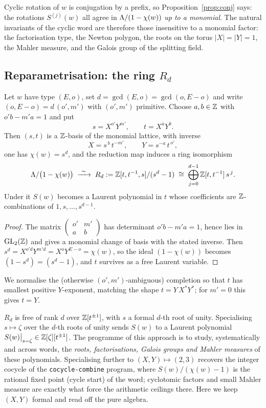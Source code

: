 Cyclic rotation of $w$ is conjugation by a prefix, so Proposition~\ref{prop:conj} says: the
rotations $S^{(j)}(w)$ all agree in $\Lambda/(1-\chi(w))$ \emph{up to a monomial}. The natural
invariants of the cyclic word are therefore those insensitive to a monomial factor: the
factorisation type, the Newton polygon, the roots on the torus $|X|=|Y|=1$, the Mahler
measure, and the Galois group of the splitting field.

\subsection*{Reparametrisation: the ring $R_d$}

\begin{prop}\label{prop:reparam}
Let $w$ have type $(E,o)$, set $d=\gcd(E,o)=\gcd(o,E-o)$ and write $(o,E-o)=d\,(o',m')$ with
$(o',m')$ primitive. Choose $a,b\in\mathbb{Z}$ with $o'b-m'a=1$ and put
\[
   s=X^{o'}Y^{m'},\qquad t=X^{a}Y^{b}.
\]
Then $(s,t)$ is a $\mathbb{Z}$-basis of the monomial lattice, with inverse
\[
   X=s^{\,b}\,t^{-m'},\qquad Y=s^{-a}\,t^{\,o'},
\]
one has $\chi(w)=s^{d}$, and the reduction map induces a ring isomorphism
\[
   \Lam/\big(1-\chi(w)\big)\;\xrightarrow{\ \sim\ }\;R_d:=\Z[t,t^{-1},s]/(s^{d}-1)
   \;\cong\;\bigoplus_{j=0}^{d-1}\Z[t,t^{-1}]\,s^{\,j}.
\]
Under it $S(w)$ becomes a Laurent polynomial in $t$ whose coefficients are $\mathbb{Z}$-combinations
of $1,s,\dots,s^{d-1}$.
\end{prop}

\begin{proof}
The matrix $\left(\begin{smallmatrix}o'&m'\\ a&b\end{smallmatrix}\right)$ has determinant
$o'b-m'a=1$, hence lies in $\mathrm{GL}_2(\mathbb{Z})$ and gives a monomial change of basis with the
stated inverse. Then $s^{d}=X^{o'd}Y^{m'd}=X^{o}Y^{E-o}=\chi(w)$, so the ideal $(1-\chi(w))$
becomes $(1-s^{d})=(s^{d}-1)$, and $t$ survives as a free Laurent variable.
\end{proof}

We normalise the (otherwise $(o',m')$-ambiguous) completion so that $t$ has smallest positive
$Y$-exponent, matching the shape $t=Y\,X^{*}Y^{*}$; for $m'=0$ this gives $t=Y$.

\begin{rem}\label{rem:program}
$R_d$ is free of rank $d$ over $\mathbb{Z}[t^{\pm1}]$, with $s$ a formal $d$-th root of unity.
Specialising $s\mapsto\zeta$ over the $d$-th roots of unity sends $S(w)$ to a Laurent
polynomial $S(w)\big|_{s=\zeta}\in\mathbb{Z}[\zeta][t^{\pm1}]$. The programme of this approach is to
study, systematically and across words, the \emph{roots, factorisations, Galois groups and
Mahler measures} of these polynomials. Specialising further to $(X,Y)\mapsto(2,3)$ recovers
the integer cocycle of the \texttt{cocycle-combine} program, where $S(w)/(\chi(w)-1)$ is the
rational fixed point (cycle start) of the word; cyclotomic factors and small Mahler measure
are exactly what force the arithmetic ceilings there. Here we keep $(X,Y)$ formal and read
off the pure algebra.
\end{rem}
